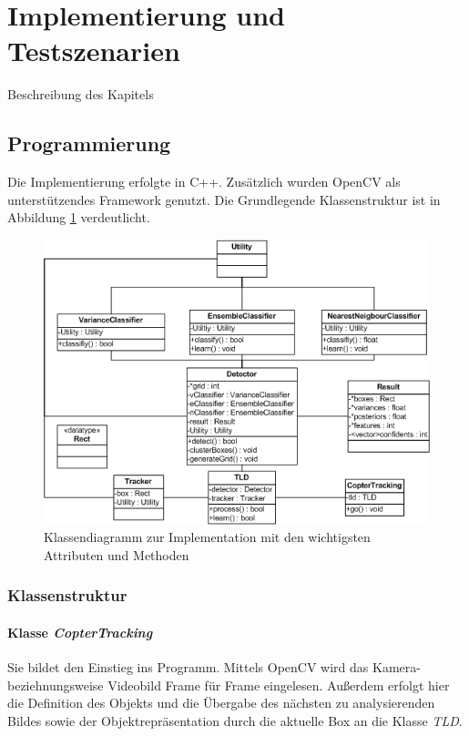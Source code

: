 \section{Implementierung und Testszenarien}
Beschreibung des Kapitels

\subsection{Programmierung}
Die Implementierung erfolgte in C++. Zusätzlich wurden OpenCV als unterstützendes Framework genutzt. Die Grundlegende Klassenstruktur ist in Abbildung \ref{klassendiagramm} verdeutlicht.

\begin{figure}
\begin{centering}
\includegraphics{../pictures/Klassendiagrammvsd.jpg}
\caption{Klassendiagramm zur Implementation mit den wichtigsten Attributen und Methoden}
\label{klassendiagramm}
\par\end{centering}
\end{figure}

\subsubsection{Klassenstruktur}
\paragraph{Klasse \textit{CopterTracking}}
Sie bildet den Einstieg ins Programm. Mittels OpenCV wird das Kamera- beziehnungsweise Videobild Frame für Frame eingelesen. Außerdem erfolgt hier die Definition des Objekts und die Übergabe des nächsten zu analysierenden Bildes sowie der Objektrepräsentation durch die aktuelle Box an die Klasse \textit{TLD}.

